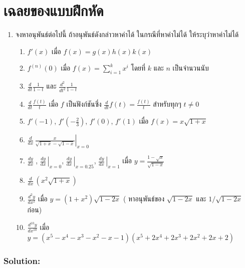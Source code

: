 \documentclass[
]{book}
\theoremstyle{definition}
\theoremstyle{definition}
\theoremstyle{definition}
\theoremstyle{definition}
\theoremstyle{remark}
\begin{document}
\chapter{เฉลยของแบบฝึกหัด}\label{uxe40uxe09uxe25uxe22uxe02uxe2duxe07uxe41uxe1auxe1auxe1duxe01uxe2buxe14}

\begin{enumerate}
\def\labelenumi{\arabic{enumi}.}
\item
  จงหาอนุพันธ์ต่อไปนี้ ถ้าอนุพันธ์ดังกล่าวหาค่าได้ ในกรณีที่หาค่าไม่ได้ ให้ระบุว่าหาค่าไม่ได้

  \begin{enumerate}
  \def\labelenumii{\arabic{enumii}.}
  \item
    \(\displaystyle f'(x)\) เมื่อ \(f(x)=g(x)h(x)k(x)\)
  \item
    \(\displaystyle f^{(n)}(0)\) เมื่อ \(\displaystyle f(x)=\sum_{i=1}^k x^i\) โดยที่ \(k\) และ \(n\) เป็นจำนวนนับ
  \item
    \(\displaystyle\frac{d}{dt}\frac1{1-t}\) และ \(\displaystyle\frac{d^2}{dt^2}\frac1{1-t}\)
  \item
    \(\displaystyle\frac{d}{dt}\frac{f(t)}t\) เมื่อ \(f\) เป็นฟังก์ชันซึ่ง \(\displaystyle\frac{d}{dt}f(t)=\frac{f(t)}t\) สำหรับทุกๆ \(t\neq0\)
  \item
    \(f'(-1)\), \(f'(-\frac23)\), \(f'(0)\), \(f'(1)\) เมื่อ \(f(x)=x\sqrt{1+x}\)
  \item
    \(\displaystyle\left.\frac d{dx}\,\frac x{\sqrt{1+x}-\sqrt{1-x}}\right|_{x=0}\)
  \item
    \(\displaystyle\frac {dy}{dx}\;\), \(\displaystyle\left.\frac {dy}{dx}\,\right|_{x=0}\), \(\displaystyle\left.\frac {dy}{dx}\,\right|_{x=0.25}\), \(\displaystyle\left.\frac {dy}{dx}\,\right|_{x=1}\) เมื่อ \(\displaystyle y=\frac{1-\sqrt x}{\sqrt{1-x}}\)
  \item
    \(\displaystyle\frac d{dx}\,\left(x^2\sqrt{1+x}\right)\)
  \item
    \(\displaystyle\frac {d^2y}{dx^2}\) เมื่อ \(y=(1+x^2)\sqrt{1-2x}\) ( หาอนุพันธ์ของ \(\sqrt{1-2x}\) และ \(1/\sqrt{1-2x}\) ก่อน)
  \item
    \(\displaystyle\frac {d^{10}y}{dx^{10}}\) เมื่อ \(y=\left(x^5-x^4-x^3-x^2-x-1\right)\left(x^5+2x^4+2x^3+2x^2+2x+2\right)\)
  \end{enumerate}
\end{enumerate}

\subsection{Solution:}\label{solution}
\end{document}
